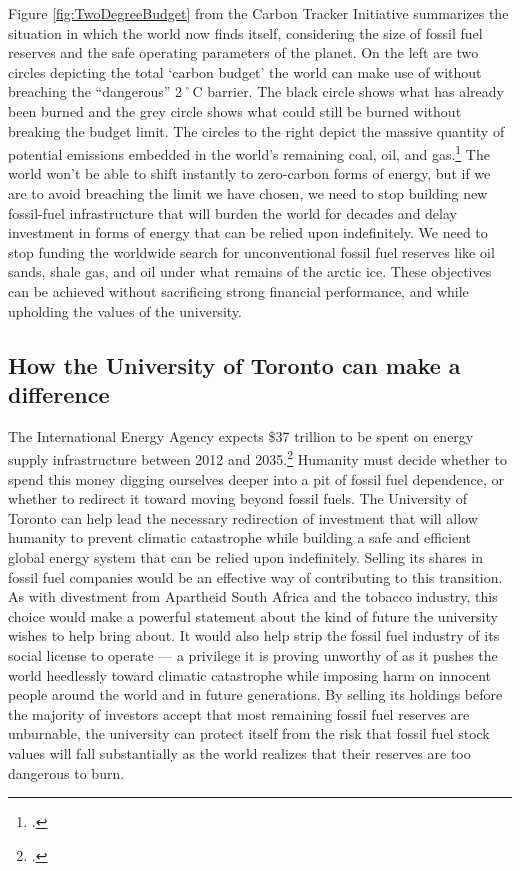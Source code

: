 Figure \ref{fig:TwoDegreeBudget} from the Carbon Tracker Initiative summarizes the situation in which the world now finds itself, considering the size of fossil fuel reserves and the safe operating parameters of the planet.
On the left are two circles depicting the total `carbon budget' the world can make use of without breaching the ``dangerous'' 2˚C barrier.
The black circle shows what has already been burned and the grey circle shows what could still be burned without breaking the budget limit.
The circles to the right depict the massive quantity of potential  emissions embedded in the world's remaining coal, oil, and gas.\footcite[][p. 6]{CTI2012}
The world won't be able to shift instantly to zero-carbon forms of energy, but if we are to avoid breaching the limit we have chosen, we need to stop building new fossil-fuel infrastructure that will burden the world for decades and delay investment in forms of energy that can be relied upon indefinitely.
We need to stop funding the worldwide search for unconventional fossil fuel reserves like oil sands, shale gas, and oil under what remains of the arctic ice.
These objectives can be achieved without sacrificing strong financial performance, and while upholding the values of the university. 




\subsection{How the University of Toronto can make a difference}



The International Energy Agency expects \$37 trillion to be spent on energy supply infrastructure between 2012 and 2035.\footcite[][]{IEA2012factsheet}
Humanity must decide whether to spend this money digging ourselves deeper into a pit of fossil fuel dependence, or whether to redirect it toward moving beyond fossil fuels.
The University of Toronto can help lead the necessary redirection of investment that will allow humanity to prevent climatic catastrophe while building a safe and efficient global energy system that can be relied upon indefinitely.
Selling its shares in fossil fuel companies would be an effective way of contributing to this transition.
As with divestment from Apartheid South Africa and the tobacco industry, this choice would make a powerful statement about the kind of future the university wishes to help bring about.
It would also help strip the fossil fuel industry of its social license to operate --- a privilege it is proving unworthy of as it pushes the world heedlessly toward climatic catastrophe while imposing harm on innocent people around the world and in future generations.
By selling its holdings before the majority of investors accept that most remaining fossil fuel reserves are unburnable, the university can protect itself from the risk that fossil fuel stock values will fall substantially as the world realizes that their reserves are too dangerous to burn.



